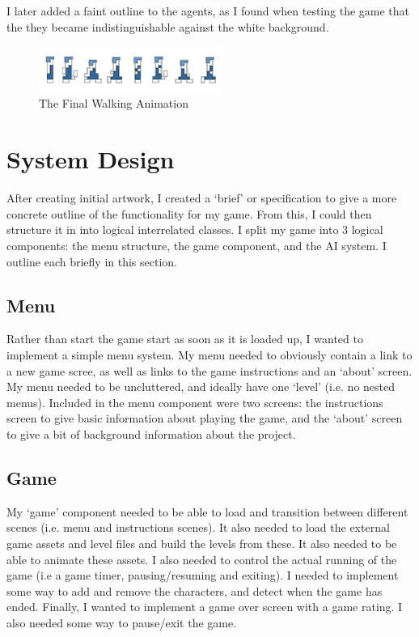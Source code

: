 \documentclass[a4paper,oneside]{report}
\begin{document}
I later added a faint outline to the agents, as I found when testing the game that the they became indistinguishable against the white background.
	
\begin{figure}[h!]
  \centering
    \includegraphics[width=60mm]{sources/images/Lemming_walk_anim}
    \caption{The Final Walking Animation}
\end{figure}
	
\chapter{System Design}

After creating initial artwork, I created a `brief' or specification to give a more concrete outline of the functionality for my game. From this, I could then structure it in into logical interrelated classes. I split my game into 3 logical components: the menu structure, the game component, and the AI system. I outline each briefly in this section.

\section{Menu}

Rather than start the game start as soon as it is loaded up, I wanted to implement a simple menu system. My menu needed to obviously contain a link to a new game scree, as well as links to the game instructions and an `about' screen. My menu needed to be uncluttered, and ideally have one `level' (i.e. no nested menus). Included in the menu component were two screens: the instructions screen to give basic information about playing the game, and the `about' screen to give a bit of background information about the project.

\section{Game}

My `game' component needed to be able to load and transition between different scenes (i.e. menu and instructions scenes). It also needed to load the external game assets and level files and build the levels from these. It also needed to be able to animate these assets. I also needed to control the actual running of the game (i.e a game timer, pausing/resuming and exiting). I needed to implement some way to add and remove the characters, and detect when the game has ended. Finally, I wanted to implement a game over screen with a game rating. I also needed some way to pause/exit the game.
\end{document}

